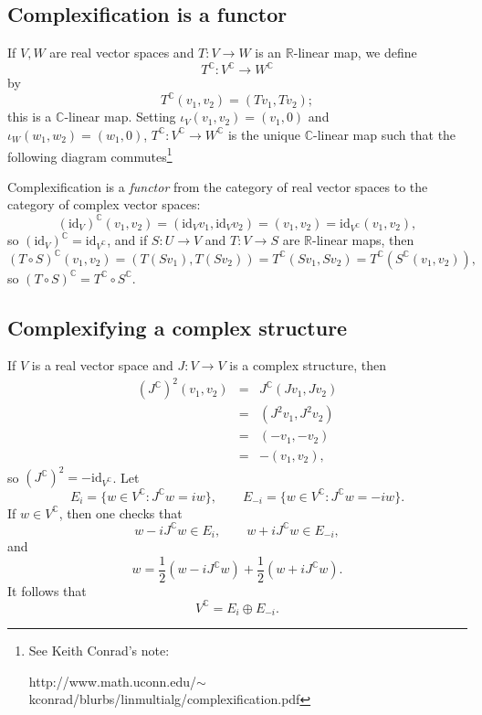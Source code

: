\documentclass{article}
\newcommand{\id}{\textrm{id}}
\begin{document}
\subsection{Complexification is a functor}
If $V,W$ are real vector spaces and $T:V \to W$ is an $\mathbb{R}$-linear map, we define 
\[
T^\mathbb{C}:V^\mathbb{C} \to W^\mathbb{C}
\]
by 
\[
T^\mathbb{C}(v_1,v_2)=(Tv_1,Tv_2);
\]
this is a $\mathbb{C}$-linear map.
Setting $\iota_V(v_1,v_2)=(v_1,0)$ and $\iota_W(w_1,w_2)=(w_1,0)$, $T^\mathbb{C}:V^\mathbb{C} \to W^\mathbb{C}$ is
the unique $\mathbb{C}$-linear map
such that the following diagram commutes\footnote{See Keith Conrad's note:

 http://www.math.uconn.edu/$\sim$kconrad/blurbs/linmultialg/complexification.pdf}
\begin{center}
\end{center}
Complexification is a {\em  functor} from the category of real vector spaces to the category of complex vector spaces: 
\[
(\id_V)^\mathbb{C}(v_1,v_2)=(\id_V v_1, \id_V v_2)=(v_1,v_2)=\id_{V^\mathbb{C}}(v_1,v_2),
\]
so $(\id_V)^\mathbb{C}=\id_{V^\mathbb{C}}$, and if $S:U \to V$ and $T:V \to S$ are $\mathbb{R}$-linear maps, then 
\[
(T \circ S)^\mathbb{C}(v_1,v_2)=(T(Sv_1),T(Sv_2))=
T^\mathbb{C}(Sv_1,Sv_2)=T^\mathbb{C}(S^\mathbb{C}(v_1,v_2)),
\]
so $(T \circ S)^\mathbb{C} =  T^\mathbb{C} \circ
S^\mathbb{C}$.




\subsection{Complexifying a complex structure}
If $V$ is a real vector space and $J:V \to V$ is a complex structure, then
\begin{eqnarray*}
(J^\mathbb{C})^2(v_1,v_2)&=&J^\mathbb{C}(Jv_1,Jv_2)\\
&=&(J^2v_1,J^2v_2)\\
&=&(-v_1,-v_2)\\
&=&-(v_1,v_2),
\end{eqnarray*}
so $(J^\mathbb{C})^2=-\id_{V^\mathbb{C}}$. 
Let
\[
E_i=\{w \in V^\mathbb{C}:J^\mathbb{C}w=iw\}, \qquad E_{-i}=\{w \in V^\mathbb{C}:
J^\mathbb{C}w=-iw\}.
\]
If $w \in V^\mathbb{C}$, then one checks that
\[
w-iJ^\mathbb{C} w \in E_i, \qquad w+iJ^\mathbb{C}w \in E_{-i},
\]
and 
\[
w=\frac{1}{2}\left(w-iJ^\mathbb{C} w\right)+\frac{1}{2}\left(w+iJ^\mathbb{C}w\right).
\]
It follows that
\[
V^\mathbb{C}=E_i \oplus E_{-i}.
\]
\end{document}
